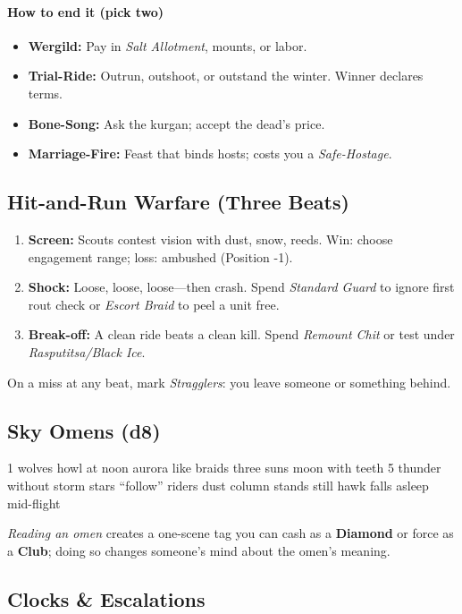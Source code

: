 \paragraph{How to end it (pick two)}
\begin{itemize}
\item \textbf{Wergild:} Pay in \emph{Salt Allotment}, mounts, or labor.
\item \textbf{Trial-Ride:} Outrun, outshoot, or outstand the winter. Winner declares terms.
\item \textbf{Bone-Song:} Ask the kurgan; accept the dead’s price.
\item \textbf{Marriage-Fire:} Feast that binds hosts; costs you a \emph{Safe-Hostage}.
\end{itemize}
\subsection*{Hit-and-Run Warfare (Three Beats)}

\begin{enumerate}
\item \textbf{Screen:} Scouts contest vision with dust, snow, reeds. Win: choose engagement range; loss: ambushed (Position -1).
\item \textbf{Shock:} Loose, loose, loose—then crash. Spend \emph{Standard Guard} to ignore first rout check or \emph{Escort Braid} to peel a unit free.
\item \textbf{Break-off:} A clean ride beats a clean kill. Spend \emph{Remount Chit} or test under \emph{Rasputitsa/Black Ice}.
\end{enumerate}
On a miss at any beat, mark \emph{Stragglers}: you leave someone or something behind.
\subsection*{Sky Omens (d8)}

1 wolves howl at noon  aurora like braids  three suns  moon with teeth  
5 thunder without storm  stars “follow” riders  dust column stands still  hawk falls asleep mid-flight

\emph{Reading an omen} creates a one-scene tag you can cash as a \textbf{Diamond} or force as a \textbf{Club}; doing so changes someone’s mind about the omen’s meaning.
\subsection*{Clocks \& Escalations}

